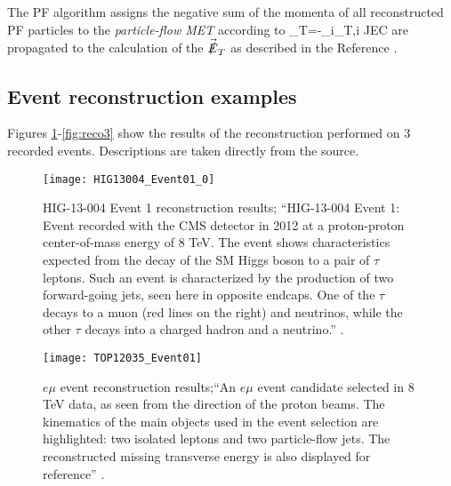 The PF algorithm assigns the negative sum of the momenta of all reconstructed PF particles to the \textit{particle-flow MET} according to
\beqn
{}_T=-\sum_{i}_{T,i}
\eeqn
JEC are propagated to the calculation of the $\vec{\slashed{E}}_T$ as described in the Reference \cite{metcorr}.

\subsection{Event reconstruction examples}

Figures \ref{fig:reco1}-\ref{fig:reco3} show the results of the reconstruction performed on 3 recorded events. Descriptions are taken directly from the source.

\begin{figure}[!h]
  \centering
  \texttt{[image: HIG13004\_Event01\_0]}
  \caption[HIG-13-004 Event 1 reconstruction.]{HIG-13-004 Event 1 reconstruction results; ``HIG-13-004 Event 1: Event recorded with the CMS detector in 2012 at a proton-proton center-of-mass energy of 8 TeV. The event shows characteristics expected from the decay of the SM Higgs boson to a pair of $\tau$ leptons. Such an event is characterized by the production of two forward-going jets, seen here in opposite endcaps. One of the $\tau$ decays to a muon (red lines on the right) and neutrinos, while the other $\tau$ decays into a charged hadron and a neutrino.'' \cite{hig13}.}\label{fig:reco1}
\end{figure}
\begin{figure}[!h]
  \centering
  \texttt{[image: TOP12035\_Event01]}
  \caption[$e\mu$ event reconstruction.]{$e\mu$ event reconstruction results;``An $e\mu$ event candidate selected in 8 TeV data, as seen from the direction of the proton beams. The kinematics of the main objects used in the event selection are highlighted: two isolated leptons and two particle-flow jets. The reconstructed missing transverse energy is also displayed for reference'' \cite{top12035}.}\label{fig:reco2}
\end{figure}

